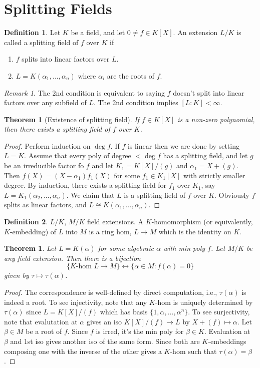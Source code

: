 \documentclass{article}
\theoremstyle{definition}
\newtheorem*{defn*}{Definition}
\theoremstyle{remark}
\newtheorem{rem}{Remark}
\theoremstyle{plain}
\newtheorem{thm}[defn]{Theorem}
\begin{document}
\section{Splitting Fields}
\begin{defn*}
    Let $K$ be a field, and let $0\neq f\in K[X]$. An extension $L/K$ is called a splitting field of $f$ over $K$ if
    \begin{enumerate}
        \item $f$ splits into linear factors over $L$.
        \item $L=K(\alpha_1,...,\alpha_n)$ where $\alpha_i$ are the roots of $f$.
    \end{enumerate}
\end{defn*}
\begin{rem}
    The 2nd condition is equivalent to saying $f$ doesn't split into linear factors over any subfield of $L$. The 2nd condition implies $[L:K]<\infty$.
\end{rem}
\begin{thm}[Existence of splitting field]
    If $f\in K[X]$ is a non-zero polynomial, then there exists a splitting field of $f$ over $K$.
\end{thm}
\begin{proof}
    Perform induction on $\deg f$. If $f$ is linear then we are done by setting $L=K$. Assume that every poly of degree $<\deg f$ has a splitting field, and let $g$ be an irreducible factor fo $f$ and let $K_1=K[X]/(g)$ and $\alpha_1=X+(g)$. Then $f(X)=(X-\alpha_1)f_1(X)$ for some $f_1\in K_1[X]$ with strictly smaller degree. By induction, there exists a splitting field for $f_1$ over $K_1$, say $L=K_1(\alpha_2,...,\alpha_n)$. We claim that $L$ is a splitting field of $f$ over $K$. Obviously $f$ splits as linear factors, and $L\cong K(\alpha_1,...,\alpha_n)$.
\end{proof}
\begin{defn*}
    $L/K$, $M/K$ field extensions. A $K$-homomorphism (or equivalently, $K$-embedding) of $L$ into $M$ is a ring hom, $L\to M$ which is the identity on $K$.
\end{defn*}
\begin{thm}
    Let $L=K(\alpha)$ for some algebraic $\alpha$ with min poly $f$. Let $M/K$ be any field extension. Then there is a bijection
    \[\{K\text{-hom }L\to M\}\leftrightarrow\{\alpha\in M:f(\alpha)=0\}\]
    given by $\tau\mapsto \tau(\alpha)$.
\end{thm}
\begin{proof}
    The correspondence is well-defined by direct computation, i.e., $\tau(\alpha)$ is indeed a root. To see injectivity, note that any $K$-hom is uniquely determined by $\tau(\alpha)$ since $L=K[X]/(f)$ which has basis $\{1,\alpha,...,\alpha^n\}$. To see surjectivity, note that evalutation at $\alpha$ gives an iso $K[X]/(f)\to L$ by $X+(f)\mapsto\alpha$. Let $\beta\in M$ be a root of $f$. Since $f$ is irred, it's the min poly for $\beta\in K$. Evaluation at $\beta$ and 1st iso gives another iso of the same form. Since both are $K$-embeddings composing one with the inverse of the other gives a $K$-hom such that $\tau(\alpha)=\beta$.
\end{proof}
\end{document}
